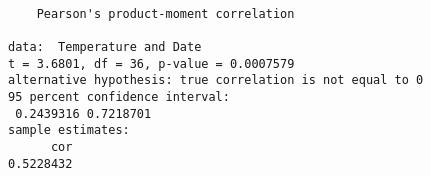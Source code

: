 \begin{verbatim} 

	Pearson's product-moment correlation

data:  Temperature and Date
t = 3.6801, df = 36, p-value = 0.0007579
alternative hypothesis: true correlation is not equal to 0
95 percent confidence interval:
 0.2439316 0.7218701
sample estimates:
      cor 
0.5228432 

\end{verbatim}